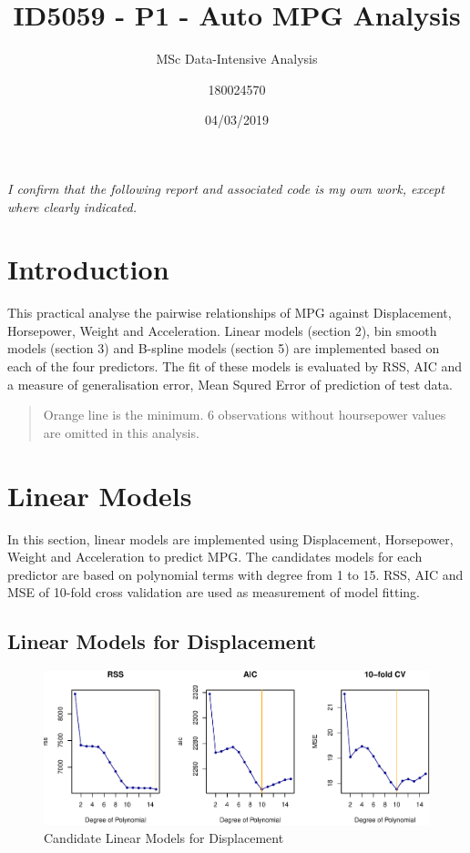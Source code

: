 \documentclass[]{article}
\title{ID5059 - P1 - Auto MPG Analysis}
\subtitle{MSc Data-Intensive Analysis}
\author{180024570}
\date{04/03/2019}
\begin{document}
\maketitle

{
\setcounter{tocdepth}{2}
\tableofcontents
}
\emph{I conﬁrm that the following report and associated code is my own
work, except where clearly indicated.}

\hypertarget{introduction}{%
\section{Introduction}\label{introduction}}

This practical analyse the pairwise relationships of MPG against
Displacement, Horsepower, Weight and Acceleration. Linear models
(section 2), bin smooth models (section 3) and B-spline models (section
5) are implemented based on each of the four predictors. The fit of
these models is evaluated by RSS, AIC and a measure of generalisation
error, Mean Squred Error of prediction of test data.

\begin{quote}
Orange line is the minimum. 6 observations without hoursepower values
are omitted in this analysis.
\end{quote}

\hypertarget{linear-models}{%
\section{Linear Models}\label{linear-models}}

In this section, linear models are implemented using Displacement,
Horsepower, Weight and Acceleration to predict MPG. The candidates
models for each predictor are based on polynomial terms with degree from
1 to 15. RSS, AIC and MSE of 10-fold cross validation are used as
measurement of model fitting.

\hypertarget{linear-models-for-displacement}{%
\subsection{Linear Models for
Displacement}\label{linear-models-for-displacement}}

\begin{figure}

{\centering \includegraphics{Report_files/figure-latex/lm-disp-1} 

}

\caption{Candidate Linear Models for Displacement}\label{fig:lm-disp}
\end{figure}
\end{document}
